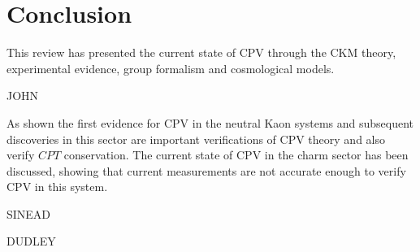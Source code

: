 \section{Conclusion}

This review has presented the current state of CPV through the CKM theory, experimental evidence, group formalism and cosmological models. 

JOHN

As shown the first evidence for CPV in the neutral Kaon systems and subsequent discoveries in this sector are important verifications of CPV theory and also verify $CPT$ conservation. The current state of CPV in the charm sector has been discussed, showing that current measurements are not accurate enough to verify CPV in this system. 

SINEAD

DUDLEY  
